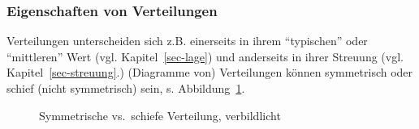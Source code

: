 \documentclass[
  letterpaper,
]{scrbook}
\theoremstyle{definition}
\theoremstyle{definition}
\theoremstyle{definition}
\theoremstyle{remark}
\begin{document}
\subsubsection{Eigenschaften von
Verteilungen}\label{eigenschaften-von-verteilungen}

Verteilungen unterscheiden sich z.B. einerseits in ihrem ``typischen''
oder ``mittleren'' Wert (vgl. Kapitel~\ref{sec-lage}) und anderseits in
ihrer Streuung (vgl. Kapitel~\ref{sec-streuung}.) (Diagramme von)
Verteilungen können symmetrisch oder schief (nicht symmetrisch) sein, s.
Abbildung~\ref{fig-symm-schief}.

\begin{figure}

\begin{minipage}{0.50\linewidth}



\end{minipage}%
%
\begin{minipage}{0.50\linewidth}



\end{minipage}%

\caption{\label{fig-symm-schief}Symmetrische vs.~schiefe Verteilung,
verbildlicht}

\end{figure}%
\end{document}
